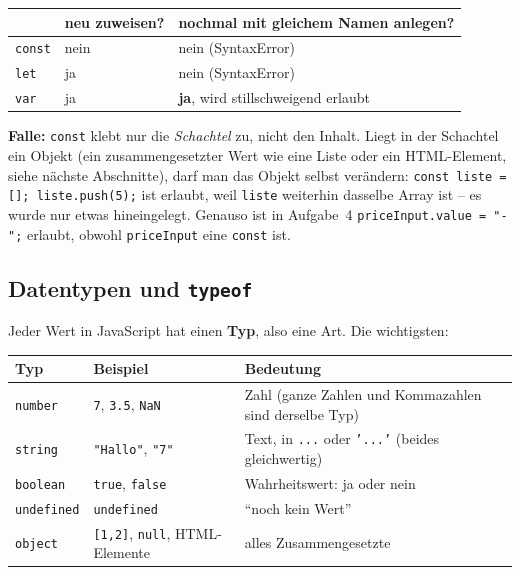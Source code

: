 \documentclass[a4paper,11pt]{article}
\begin{document}
\begin{merkbox}
\begin{tabular}{@{}lll@{}}
\toprule
 & neu zuweisen? & nochmal mit gleichem Namen anlegen?\\
\midrule
\texttt{const} & nein & nein (SyntaxError)\\
\texttt{let}   & ja   & nein (SyntaxError)\\
\texttt{var}   & ja   & \textbf{ja}, wird stillschweigend erlaubt\\
\bottomrule
\end{tabular}

\medskip
\textbf{Falle:} \texttt{const} klebt nur die \emph{Schachtel} zu, nicht den Inhalt. Liegt in der Schachtel ein
Objekt (ein zusammengesetzter Wert wie eine Liste oder ein HTML-Element, siehe nächste Abschnitte), darf man das
Objekt selbst verändern:
\lstinline|const liste = []; liste.push(5);| ist erlaubt, weil \texttt{liste} weiterhin dasselbe Array ist --
es wurde nur etwas hineingelegt. Genauso ist in Aufgabe~4 \lstinline|priceInput.value = "-";| erlaubt, obwohl
\texttt{priceInput} eine \texttt{const} ist.
\end{merkbox}

\subsection{Datentypen und \texttt{typeof}}

Jeder Wert in JavaScript hat einen \textbf{Typ}, also eine Art. Die wichtigsten:

\begin{center}
\begin{tabular}{@{}llp{6.5cm}@{}}
\toprule
Typ & Beispiel & Bedeutung\\
\midrule
\texttt{number}    & \lstinline|7|, \lstinline|3.5|, \lstinline|NaN| & Zahl (ganze Zahlen und Kommazahlen sind derselbe Typ)\\
\texttt{string}    & \lstinline|"Hallo"|, \lstinline|"7"| & Text, in \texttt{\textquotedbl{}...\textquotedbl{}} oder \texttt{'...'} (beides gleichwertig)\\
\texttt{boolean}   & \lstinline|true|, \lstinline|false| & Wahrheitswert: ja oder nein\\
\texttt{undefined} & \lstinline|undefined| & "`noch kein Wert"'\\
\texttt{object}    & \lstinline|[1,2]|, \lstinline|null|, HTML-Elemente & alles Zusammengesetzte\\
\bottomrule
\end{tabular}
\end{center}
\end{document}
